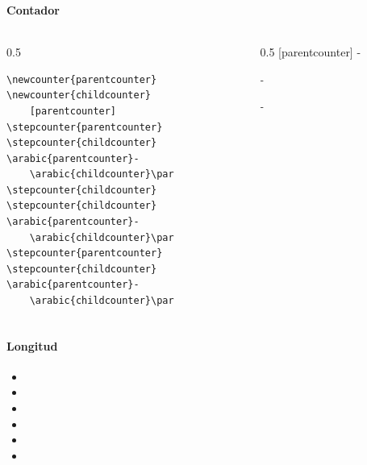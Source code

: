 \documentclass[12pt,aspectratio=169,ignorenonframetext]{ltxbeamer}
\begin{document}
\begin{frame}[fragile]
\frametitle{{\lmr\LaTeXe}}
\framesubtitle{Contador}

\begin{columns}
    \begin{column}{0.5\textwidth}
        \begin{verbatim}
\newcounter{parentcounter}
\newcounter{childcounter}
    [parentcounter]
\stepcounter{parentcounter}
\stepcounter{childcounter}
\arabic{parentcounter}-
    \arabic{childcounter}\par
\stepcounter{childcounter}
\stepcounter{childcounter}
\arabic{parentcounter}-
    \arabic{childcounter}\par
\stepcounter{parentcounter}
\stepcounter{childcounter}
\arabic{parentcounter}-
    \arabic{childcounter}\par
        \end{verbatim}
    \end{column}
    {\color{gray} \vline}
    \begin{column}{0.5\linewidth}%
        \lmr%
        [parentcounter]%
        -\par
        -\par
        -\par
    \end{column}
\end{columns}
\end{frame}





\begin{frame}[fragile]
\frametitle{{\lmr\LaTeXe}}
\framesubtitle{Longitud}

\begin{itemize}
    \item \texttt{\newlength}
    \item \texttt{\setlength}
    \item \texttt{\addtolength}
    \item \texttt{\settodepth}
    \item \texttt{\settoheight}
    \item \texttt{\settowidth}
\end{itemize}
\end{frame}
\end{document}

